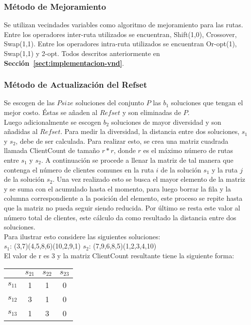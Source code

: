 \subsubsection*{Método de Mejoramiento}

Se utilizan vecindades variables como algoritmo de mejoramiento para las rutas. Entre los operadores inter-ruta utilizados se encuentran, Shift(1,0), Crossover, Swap(1,1). Entre los operadores intra-ruta utilizados se encuentran Or-opt(1), Swap(1,1) y 2-opt. Todos descritos anteriormente en \textbf{Sección~\ref{sect:implementacion-vnd}}.

\subsubsection*{Método de Actualización del Refset}

Se escogen de las $Psize$ soluciones del conjunto $P$ las $b_{1}$ so\-lu\-cio\-nes que tengan el mejor costo. Éstas se añaden al $Refset$ y son eliminadas de $P$.\\ 

Luego adicionalmente se escogen $b_{2}$ soluciones de mayor diversidad y son añadidas al $Refset$. Para medir la diversidad, la distancia entre dos soluciones, $s_{1}$ y $s_{2}$,   debe de ser calculada. Para realizar esto, se crea una matriz cuadrada llamada ClientCount de tamaño $r*r$, donde $r$ es el máximo número de rutas entre $s_{1}$ y $s_2$. A continuación se procede a llenar la matriz de tal manera que contenga el número de clientes comunes en la ruta $i$ de la solución $s_1$ y la ruta $j$ de la solución $s_{2}$. Una vez realizado esto se  busca el mayor elemento de la matriz y se suma con el acumulado hasta el momento, para luego borrar la fila y la columna correspondiente a la posición del elemento, este proceso se repite hasta que la matriz no pueda seguir siendo reducida. Por último se resta este valor al número total de clientes, este cálculo da como resultado la distancia entre dos soluciones.\\

Para ilustrar esto considere las siguientes soluciones:\\

$s_{1}$: (3,7)(4,5,8,6)(10,2,9,1)
$s_{2}$: (7,9,6,8,5)(1,2,3,4,10)\\

El valor de r es 3 y la matriz ClientCount resultante tiene la siguiente forma:\\

\begin{tabular}{|c|c|c|c|}
\hline \rule[-2ex]{0pt}{5.5ex} { } & $s_{21}$ & $s_{22}$ & $s_{23}$ \\ 
\hline \rule[-2ex]{0pt}{5.5ex} $s_{11}$ & 1 & 1 & 0 \\ 
\hline \rule[-2ex]{0pt}{5.5ex} $s_{12}$ & 3 & 1 & 0 \\ 
\hline \rule[-2ex]{0pt}{5.5ex} $s_{13}$ & 1 & 3 & 0 \\ 
\hline 
\end{tabular}\\\\ 



